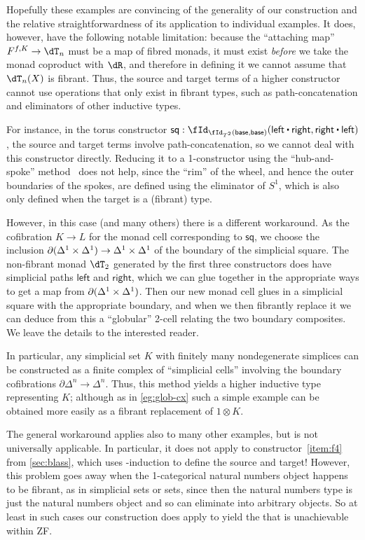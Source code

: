 \documentclass[referee]{psp}
\let\N\iN
\let\sec\S
\let\S\cS
\begin{document}
Hopefully these examples are convincing of the generality of our construction and the relative straightforwardness of its application to individual examples.
It does, however, have the following notable limitation: because the ``attaching map'' $F^{f,K}\to \dT_n$ must be a map of fibred monads, it must exist \emph{before} we take the monad coproduct with $\dR$, and therefore in defining it we cannot assume that $\dT_n(X)$ is fibrant.
Thus, the source and target terms of a higher constructor cannot use operations that only exist in fibrant types, such as path-concatenation and eliminators of other inductive types.

For instance, in the torus constructor $\mathsf{sq} : \id[{\id[T^2]{\mathsf{base}}{\mathsf{base}}}]{\mathsf{left}\ct\mathsf{right}}{\mathsf{right}\ct\mathsf{left}}$, the source and target terms involve path-concatenation, so we cannot deal with this constructor directly.
Reducing it to a 1-constructor using the ``hub-and-spoke'' method~\cite[\sec6.7]{hottbook} does not help, since the ``rim'' of the wheel, and hence the outer boundaries of the spokes, are defined using the eliminator of $S^1$, which is also only defined when the target is a (fibrant) type.

However, in this case (and many others) there is a different workaround.
As the cofibration $K\to L$ for the monad cell corresponding to $\mathsf{sq}$, we choose the inclusion $\partial({\Delta^1}\times{\Delta^1}) \to {\Delta^1}\times{\Delta^1}$ of the boundary of the simplicial square.
The non-fibrant monad $\dT_2$ generated by the first three constructors does have simplicial paths $\mathsf{left}$ and $\mathsf{right}$, which we can glue together in the appropriate ways to get a map from $\partial({\Delta^1}\times{\Delta^1})$.
Then our new monad cell glues in a simplicial square with the appropriate boundary, and when we then fibrantly replace it we can deduce from this a ``globular'' 2-cell relating the two boundary composites.
We leave the details to the interested reader.

In particular, any simplicial set $K$ with finitely many nondegenerate simplices can be constructed as a finite complex of ``simplicial cells'' involving the boundary cofibrations $\partial\Delta^n \to \Delta^n$.
Thus, this method yields a higher inductive type representing $K$; although as in \cref{eg:glob-cx} such a simple example can be obtained more easily as a fibrant replacement of $1\otimes K$.

The general workaround applies also to many other examples, but is not universally applicable.
In particular, it does not apply to constructor~\ref{item:f4} from \cref{sec:blass}, which uses \N-induction to define the source and target!
However, this problem goes away when the 1-categorical natural numbers object happens to be fibrant, as in simplicial sets or sets, since then the natural numbers type is just the natural numbers object and so can eliminate into arbitrary objects.
So at least in such cases our construction does apply to yield the \iF that is unachievable within ZF.
\end{document}
